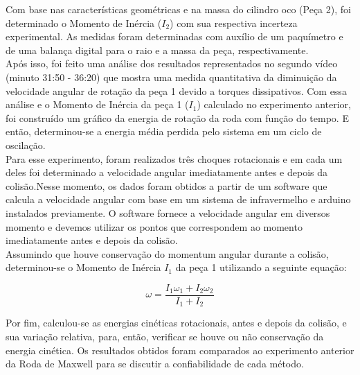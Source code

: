 Com base nas características geométricas e na massa do cilindro oco (Peça 2), foi determinado o Momento de Inércia ($I_2$) com sua respectiva incerteza experimental. As medidas foram determinadas com auxílio de um paquímetro e de uma balança digital para o raio e a massa da peça, respectivamente.\\

Após isso, foi feito uma análise dos resultados representados no segundo vídeo (minuto 31:50 - 36:20) que mostra uma medida quantitativa da diminuição da velocidade angular de rotação da peça 1 devido a torques dissipativos. Com essa análise e o Momento de Inércia da peça 1 ($I_1$) calculado no experimento anterior, foi construído um gráfico da energia de rotação da roda com função do tempo. E então, determinou-se a energia média perdida pelo sistema em um ciclo de oscilação.\\

Para esse experimento, foram realizados três choques rotacionais e em cada um deles foi determinado a velocidade angular imediatamente antes e depois da colisão.Nesse momento, os dados foram obtidos a partir de um software que calcula a velocidade angular com base em um sistema de infravermelho e arduino instalados previamente. O software fornece a velocidade angular em diversos momento e devemos utilizar os pontos que correspondem ao momento imediatamente antes e depois da colisão.\\

Assumindo que houve conservação do momentum angular durante a colisão, determinou-se o Momento de Inércia $I_1$ da peça 1 utilizando a seguinte equação:

\[ \omega = \frac{I_1 \omega_1+I_2 \omega_2}{I_1+I_2} \]

Por fim, calculou-se as energias cinéticas rotacionais, antes e depois da colisão, e sua variação relativa, para, então, verificar se houve ou não conservação da energia cinética. Os resultados obtidos foram comparados ao experimento anterior da Roda de Maxwell para se discutir a confiabilidade de cada método.
